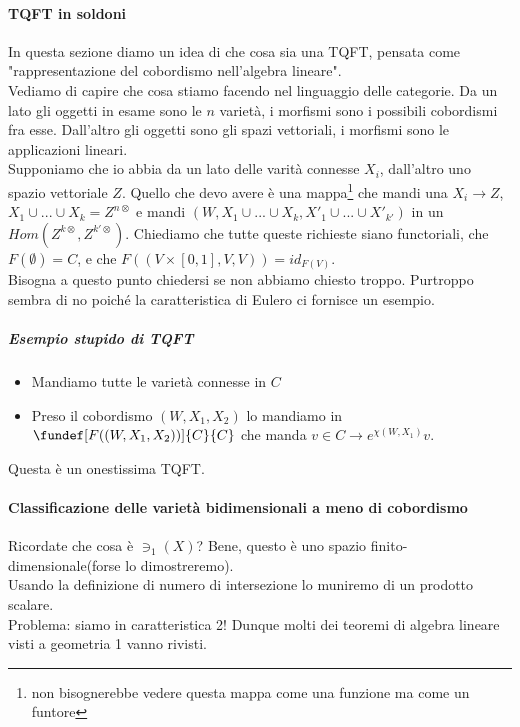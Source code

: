 \paragraph{TQFT in soldoni}
In questa sezione diamo un idea di che cosa sia una TQFT, pensata come "rappresentazione del cobordismo nell'algebra lineare".\\
Vediamo di capire che cosa stiamo facendo nel linguaggio delle categorie. Da un lato gli oggetti in esame sono le $n$ varietà, i morfismi sono i possibili cobordismi fra esse.
Dall'altro gli oggetti sono gli spazi vettoriali, i morfismi sono le applicazioni lineari.\\
Supponiamo che io abbia da un lato delle varità connesse $X_i$, dall'altro uno spazio vettoriale $Z$. Quello che devo avere è una mappa\footnote{non bisognerebbe vedere questa mappa come una funzione ma come un funtore} che mandi una $X_i\rightarrow Z$, $X_1\cup ... \cup X_k =Z^{n\otimes}$ e mandi $(W, X_1\cup ... \cup X_k, X'_1\cup ... \cup X'_{k'})$ in un $Hom(Z^{k\otimes}, Z^{k'\otimes})$.
Chiediamo che tutte queste richieste siano functoriali, che $F(\emptyset)=C$, e che $F((V\times[0, 1], V, V))=id_{F(V)}$. \\
Bisogna a questo punto chiedersi se non abbiamo chiesto troppo. Purtroppo sembra di no poiché la caratteristica di Eulero ci fornisce un esempio.
\subparagraph{Esempio stupido di TQFT}
\begin{itemize}
\item Mandiamo tutte le varietà connesse in $C$
\item Preso il cobordismo $(W, X_1, X_2)$ lo mandiamo in $\fundef[F((W, X_1, X_2))]{C}{C}$ che manda $v\in C \rightarrow e^{\chi(W, X_1)}v$.
\end{itemize}
Questa è un onestissima TQFT.


\paragraph{Classificazione delle varietà bidimensionali a meno di cobordismo}
Ricordate che cosa è $\ni _1(X)$? Bene, questo è uno spazio finito-dimensionale(forse lo dimostreremo).\\
Usando la definizione di numero di intersezione lo muniremo di un prodotto scalare. \\
Problema: siamo in caratteristica 2! Dunque molti dei teoremi di algebra lineare visti a geometria 1 vanno rivisti.







